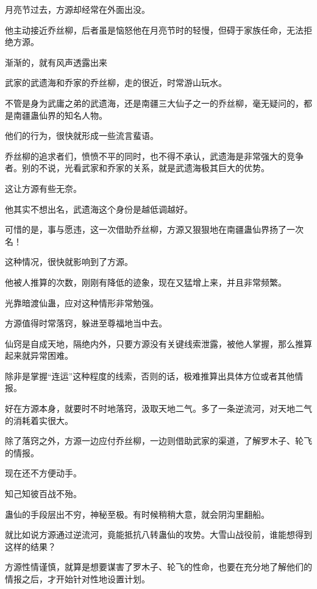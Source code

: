 
\begin{this_body}

月亮节过去，方源却经常在外面出没。

他主动接近乔丝柳，后者虽是恼怒他在月亮节时的轻慢，但碍于家族任命，无法拒绝方源。

渐渐的，就有风声透露出来

武家的武遗海和乔家的乔丝柳，走的很近，时常游山玩水。

不管是身为武庸之弟的武遗海，还是南疆三大仙子之一的乔丝柳，毫无疑问的，都是南疆蛊仙界的知名人物。

他们的行为，很快就形成一些流言蜚语。

乔丝柳的追求者们，愤愤不平的同时，也不得不承认，武遗海是非常强大的竞争者。别的不说，光看武家和乔家的关系，就是武遗海极其巨大的优势。

这让方源有些无奈。

他其实不想出名，武遗海这个身份是越低调越好。

可惜的是，事与愿违，这一次借助乔丝柳，方源又狠狠地在南疆蛊仙界扬了一次名！

这种情况，很快就影响到了方源。

他被人推算的次数，刚刚有降低的迹象，现在又猛增上来，并且非常频繁。

光靠暗渡仙蛊，应对这种情形非常勉强。

方源值得时常落窍，躲进至尊福地当中去。

仙窍是自成天地，隔绝内外，只要方源没有关键线索泄露，被他人掌握，那么推算起来就异常困难。

除非是掌握“连运”这种程度的线索，否则的话，极难推算出具体方位或者其他情报。

好在方源本身，就要时不时地落窍，汲取天地二气。多了一条逆流河，对天地二气的消耗着实很大。

除了落窍之外，方源一边应付乔丝柳，一边则借助武家的渠道，了解罗木子、轮飞的情报。

现在还不方便动手。

知己知彼百战不殆。

蛊仙的手段层出不穷，神秘至极。有时候稍稍大意，就会阴沟里翻船。

就比如说方源通过逆流河，竟能抵抗八转蛊仙的攻势。大雪山战役前，谁能想得到这样的结果？

方源性情谨慎，就算是想要谋害了罗木子、轮飞的性命，也要在充分地了解他们的情报之后，才开始针对性地设置计划。


\end{this_body}
